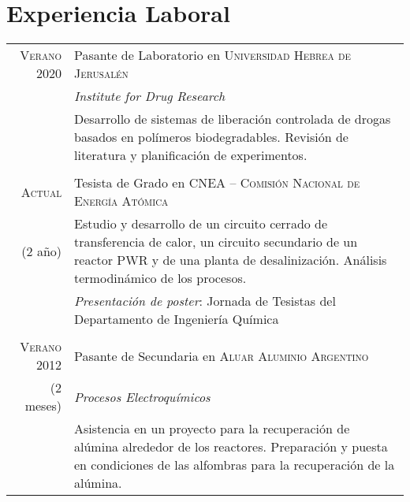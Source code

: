\documentclass[a4paper,10pt]{article}
\begin{document}
\section{Experiencia Laboral}\smallskip
\begin{tabular}{r|p{11cm}}
\textsc{Verano 2020} & Pasante de Laboratorio en \textsc{Universidad Hebrea de Jerusalén}\\& \emph{Institute for Drug Research}\\&\footnotesize{Desarrollo de sistemas de liberación controlada de drogas basados en polímeros biodegradables. Revisión de literatura y planificación de experimentos.}\\\multicolumn{2}{c}{}\\
 
 \textsc{Actual}&Tesista de Grado en \textsc{CNEA -- Comisión Nacional de Energía Atómica}  \\(2 año)&\footnotesize{Estudio y desarrollo de un circuito cerrado de transferencia de calor, un circuito secundario de un reactor PWR y de una planta de desalinización. Análisis termodinámico de los procesos.}
 \\&\footnotesize{\emph{Presentación de poster}: Jornada de Tesistas del Departamento de Ingeniería Química}\\\multicolumn{2}{c}{} \\
\textsc{Verano 2012} & Pasante de Secundaria en \textsc{Aluar Aluminio Argentino}\\(2 meses)& \emph{Procesos Electroquímicos}\\&\footnotesize{Asistencia en un proyecto para la recuperación de alúmina alrededor de los reactores. Preparación y puesta en condiciones de las alfombras para la recuperación de la alúmina.}
\end{tabular}\smallskip
\end{document}
